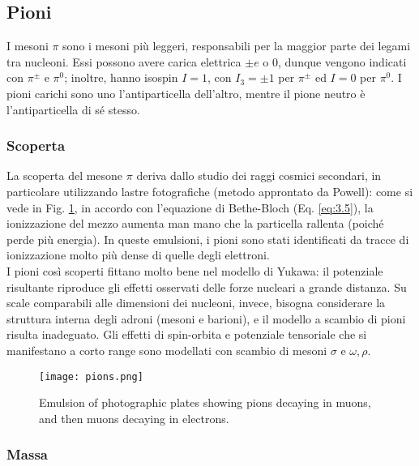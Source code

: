 \subsection{Pioni}

I mesoni $ \pi $ sono i mesoni più leggeri, responsabili per la maggior parte dei legami tra nucleoni. Essi possono avere carica elettrica $ \pm e $ o 0, dunque vengono indicati con $ \pi^{\pm} $ e $ \pi^0 $; inoltre, hanno isospin $ I = 1 $, con $ I_3 = \pm 1 $ per $ \pi^{\pm} $ ed $ I = 0 $ per $ \pi^0 $. I pioni carichi sono uno l'antiparticella dell'altro, mentre il pione neutro è l'antiparticella di sé stesso.

\subsubsection{Scoperta}

La scoperta del mesone $ \pi $ deriva dallo studio dei raggi cosmici secondari, in particolare utilizzando lastre fotografiche (metodo approntato da Powell): come si vede in Fig. \ref{pion-det}, in accordo con l'equazione di Bethe-Bloch (Eq. \ref{eq:3.5}), la ionizzazione del mezzo aumenta man mano che la particella rallenta (poiché perde più energia). In queste emulsioni, i pioni sono stati identificati da tracce di ionizzazione molto più dense di quelle degli elettroni.\\
I pioni così scoperti fittano molto bene nel modello di Yukawa: il potenziale risultante riproduce gli effetti osservati delle forze nucleari a grande distanza. Su scale comparabili alle dimensioni dei nucleoni, invece, bisogna considerare la struttura interna degli adroni (mesoni e barioni), e il modello a scambio di pioni risulta inadeguato. Gli effetti di spin-orbita e potenziale tensoriale che si manifestano a corto range sono modellati con scambio di mesoni $ \sigma $ e $ \omega,\rho $.

\begin{figure}
	\centering
	\texttt{[image: pions.png]}
	\caption{Emulsion of photographic plates showing pions decaying in muons, and then muons decaying in electrons.}
	\label{pion-det}
\end{figure}

\subsubsection{Massa}

